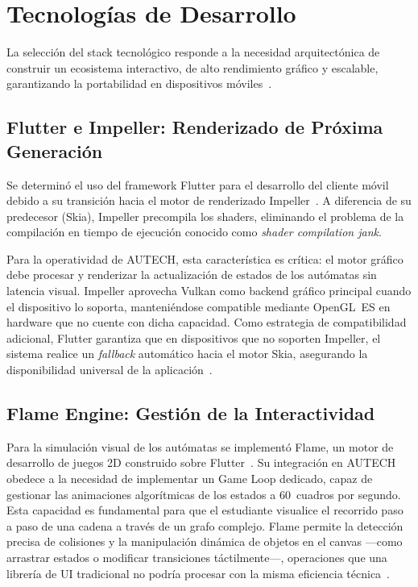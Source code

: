 \newpage
\section{Tecnologías de Desarrollo}
\label{sec:tecnologias}

La selección del stack tecnológico responde a la necesidad arquitectónica de construir un
ecosistema interactivo, de alto rendimiento gráfico y escalable, garantizando la portabilidad
en dispositivos móviles~\cite{pressman2020}.

\subsection{Flutter e Impeller: Renderizado de Próxima Generación}
\label{ssec:flutter_impeller}

Se determinó el uso del framework Flutter para el desarrollo del cliente móvil debido a su
transición hacia el motor de renderizado Impeller~\cite{flutter2024a}. A diferencia de su
predecesor (Skia), Impeller precompila los shaders, eliminando el problema de la compilación
en tiempo de ejecución conocido como \textit{shader compilation jank}.

Para la operatividad de AUTECH, esta característica es crítica: el motor gráfico debe procesar
y renderizar la actualización de estados de los autómatas sin latencia visual. Impeller aprovecha
Vulkan como backend gráfico principal cuando el dispositivo lo soporta, manteniéndose compatible
mediante OpenGL~ES en hardware que no cuente con dicha capacidad. Como estrategia de
compatibilidad adicional, Flutter garantiza que en dispositivos que no soporten Impeller, el
sistema realice un \textit{fallback} automático hacia el motor Skia, asegurando la
disponibilidad universal de la aplicación~\cite{google2023android, flutter2024a}.

\subsection{Flame Engine: Gestión de la Interactividad}
\label{ssec:flame_engine}

Para la simulación visual de los autómatas se implementó Flame, un motor de desarrollo de
juegos 2D construido sobre Flutter~\cite{flame2024}. Su integración en AUTECH obedece a la
necesidad de implementar un Game Loop dedicado, capaz de gestionar las animaciones
algorítmicas de los estados a 60~cuadros por segundo. Esta capacidad es fundamental para que
el estudiante visualice el recorrido paso a paso de una cadena a través de un grafo complejo.
Flame permite la detección precisa de colisiones y la manipulación dinámica de objetos en el
canvas ---como arrastrar estados o modificar transiciones táctilmente---, operaciones que una
librería de UI tradicional no podría procesar con la misma eficiencia técnica~\cite{flame2024}.

